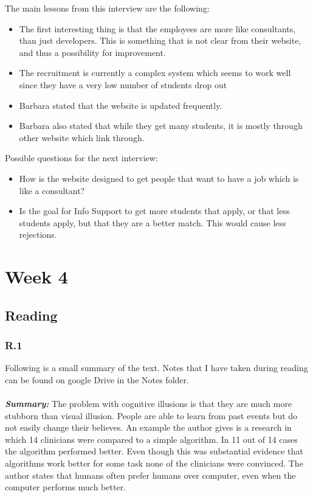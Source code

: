 \documentclass[]{article}
\begin{document}
\noindent The main lessons from this interview are the following:
\begin{itemize}
    \item The first interesting thing is that the employees are more like consultants,
    than just developers. This is something that is not clear from their website,
    and thus a possibility for improvement.
    \item The recruitment is currently a complex system which seems to work well
    since they have a very low number of students drop out
    \item Barbara stated that the website is updated frequently.
    \item Barbara also stated that while they get many students, it is mostly 
    through other website which link through.
\end{itemize}

\noindent Possible questions for the next interview:
\begin{itemize}
    \item How is the website designed to get people that want to have a job which 
    is like a consultant?
    \item Is the goal for Info Support to get more students that apply, or that 
    less students apply, but that they are a better match. This would cause less 
    rejections. 
\end{itemize}

\section*{Week 4}

\subsection*{Reading} 

\subsubsection*{R.1} 
Following is a small summary of the text. Notes that I have taken during reading 
can be found on google Drive in the Notes folder.\\\\
\textbf{\textit{Summary:}} 
The problem with cognitive illusions is that they are much more stubborn than 
visual illusion. People are able to learn from past events but do not easily 
change their believes. An example the author gives is a research in which 
14 clinicians were compared to a simple algorithm. In 11 out of 14 cases the 
algorithm performed better. Even though this was substantial evidence that 
algorithms work better for some task none of the clinicians were convinced. 
The author states that humans often prefer humans over computer, even when 
the computer performs much better.  
\end{document}

